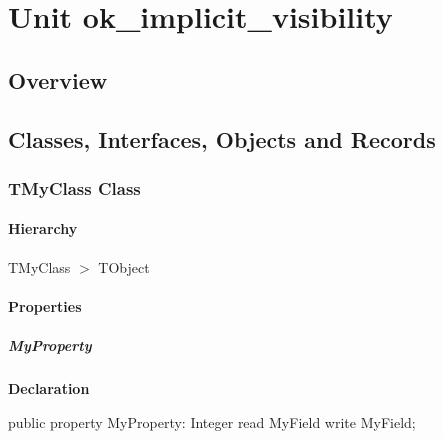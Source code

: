 \documentclass{report}
\begin{document}
\newlength{\tmplength}
\chapter{Unit ok{\_}implicit{\_}visibility}
\section{Overview}
\begin{description}
\item[\texttt{\begin{ttfamily}TMyClass\end{ttfamily} Class}]
\item[\texttt{\begin{ttfamily}TMyClassInMState\end{ttfamily} Class}]
\end{description}
\section{Classes, Interfaces, Objects and Records}
\subsection*{TMyClass Class}
\subsubsection*{\large{\textbf{Hierarchy}}\normalsize\hspace{1ex}\hfill}
TMyClass {$>$} TObject
\subsubsection*{\large{\textbf{Properties}}\normalsize\hspace{1ex}\hfill}
\paragraph*{MyProperty}\hspace*{\fill}

\begin{list}{}{
\setlength{\itemindent}{0cm}
\setlength{\listparindent}{0cm}
\setlength{\leftmargin}{\evensidemargin}
\addtolength{\leftmargin}{\tmplength}
\settowidth{\labelsep}{X}
\addtolength{\leftmargin}{\labelsep}
\setlength{\labelwidth}{\tmplength}
}
\begin{flushleft}
\item[\textbf{Declaration}\hfill]
\begin{ttfamily}
public property MyProperty: Integer read MyField write MyField;\end{ttfamily}


\end{flushleft}
\end{list}
\end{document}
